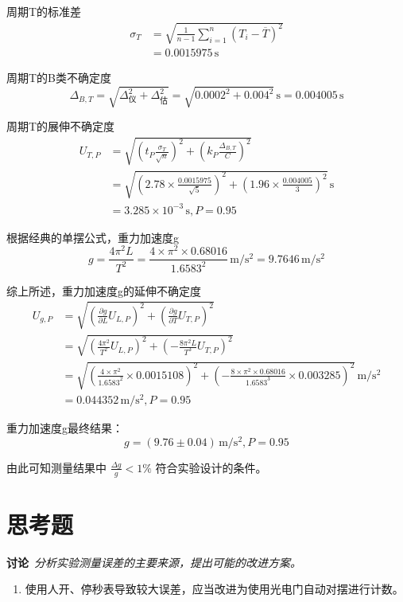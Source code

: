 \documentclass[UTF8]{article}
\newcommand{\sector}[2]{\section*{#1}%
\vspace*{-0.8em}\large{#2}%
\vspace*{-0.3em}
}
\begin{document}
{周期T的标准差
$$
\begin{aligned}
\sigma_{T}&=\sqrt{\frac{1}{n-1}\sum_{i=1}^n\left(T_i-\overline{T}\right)^2}\\
&=0.0015975\,\mathrm{s}
\end{aligned}
$$

周期T的B类不确定度
$$
\Delta_{B,T}=\sqrt{\Delta_\text{仪}^2+\Delta_\text{估}^2}=\sqrt{0.0002^2+0.004^2}\,\mathrm{s}=0.004005\,\mathrm{s}
$$

周期T的展伸不确定度
$$
\begin{aligned}
U_{T,P}&=\sqrt{\left(t_P\frac{\sigma_{T}}{\sqrt{n}}\right)^2+\left(k_P\frac{\Delta_{B,T}}{C}\right)^2}\\
&=\sqrt{\left(2.78\times\frac{0.0015975}{\sqrt{5}}\right)^2+\left(1.96\times\frac{0.004005}{3}\right)^2}\,\mathrm{s}\\
&=3.285 \times 10^{-3}\,\mathrm{s},P=0.95
\end{aligned}
$$

根据经典的单摆公式，重力加速度g
$$
g=\frac{4 \pi^{2} L}{T^{2}}=\frac{4\times \pi^2\times 0.68016}{1.6583^2}\,\mathrm{m/s^2}=9.7646\,\mathrm{m/s^2}
$$

综上所述，重力加速度g的延伸不确定度
$$
\begin{aligned}
U_{g,P}&=\sqrt{\left(\frac{\partial g}{\partial L}U_{L,P}\right)^2+\left(\frac{\partial g}{\partial T}U_{T,P}\right)^2}\\
&=\sqrt{\left(\frac{4 \pi^{2}}{T^{2}}U_{L,P}\right)^2+\left(- \frac{8 \pi^{2} L}{T^{3}}U_{T,P}\right)^2}\\
&=\sqrt{\left(\frac{4\times \pi^2}{1.6583^2}\times 0.0015108\right)^2+\left(-\frac{8\times \pi^2\times 0.68016}{1.6583^3}\times 0.003285\right)^2}\,\mathrm{m/s^2}\\
&=0.044352\,\mathrm{m/s^2},P=0.95
\end{aligned}
$$

重力加速度g最终结果：
$$
g=\left(9.76 \pm 0.04\right)\,\mathrm{m/s^2} ,P=0.95
$$

由此可知测量结果中 $\frac{\Delta g}{g} < 1\%$ 符合实验设计的条件。

}\sector{思考题}{

    \textbf{讨论}\ \textsl{分析实验测量误差的主要来源，提出可能的改进方案。}

    \begin{enumerate}[itemindent=1.3em,parsep=5pt,label=\arabic*.]
        \item 使用人开、停秒表导致较大误差，应当改进为使用光电门自动对摆进行计数。
        

\end{enumerate}}
\end{document}
